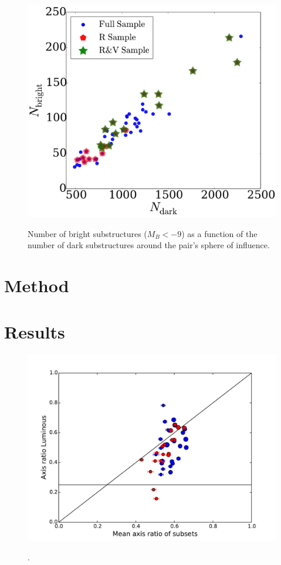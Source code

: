 \documentclass{emulateapj}
\begin{document}
\begin{figure}
\centering
\includegraphics[width=\hsize]{n_structure.pdf}\\
\caption{Number of bright substructures ($M_{B}<-9$) as a function of
  the number of dark substructures around the pair's sphere of influence.}
\label{fig:nstructure}
\end{figure}



\section{Method}
\label{Method}


\section{Results}
\label{Results}
\begin{figure}
\centering
\includegraphics[width=\hsize]{AxisRatio_RandomMean_VS_Luminous.pdf}\\
\caption{.}
\label{fig:StreamPlaneOrbit}
\end{figure}
\end{document}
